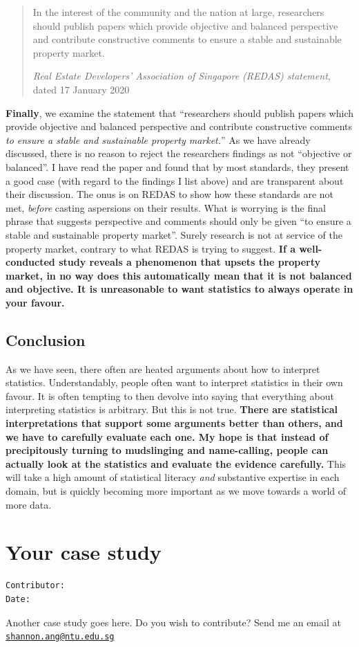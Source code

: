 \documentclass[openany]{book}
\begin{document}
\begin{quote}
In the interest of the community and the nation at large, researchers
should publish papers which provide objective and balanced perspective
and contribute constructive comments to ensure a stable and sustainable
property market.

\emph{Real Estate Developers' Association of Singapore (REDAS)
statement}, dated 17 January 2020
\end{quote}

\textbf{Finally}, we examine the statement that ``researchers should
publish papers which provide objective and balanced perspective and
contribute constructive comments \emph{to ensure a stable and
sustainable property market.}'' As we have already discussed, there is
no reason to reject the researchers findings as not ``objective or
balanced''. I have read the paper and found that by most standards, they
present a good case (with regard to the findings I list above) and are
transparent about their discussion. The onus is on REDAS to show how
these standards are not met, \emph{before} casting aspersions on their
results. What is worrying is the final phrase that suggests perspective
and comments should only be given ``to ensure a stable and sustainable
property market''. Surely research is not at service of the property
market, contrary to what REDAS is trying to suggest. \textbf{If a
well-conducted study reveals a phenomenon that upsets the property
market, in no way does this automatically mean that it is not balanced
and objective. It is unreasonable to want statistics to always operate
in your favour.}

\section{Conclusion}\label{conclusion-4}

As we have seen, there often are heated arguments about how to interpret
statistics. Understandably, people often want to interpret statistics in
their own favour. It is often tempting to then devolve into saying that
everything about interpreting statistics is arbitrary. But this is not
true. \textbf{There are statistical interpretations that support some
arguments better than others, and we have to carefully evaluate each
one. My hope is that instead of precipitously turning to mudslinging and
name-calling, people can actually look at the statistics and evaluate
the evidence carefully.} This will take a high amount of statistical
literacy \emph{and} substantive expertise in each domain, but is quickly
becoming more important as we move towards a world of more data.

\chapter{Your case study}\label{case3}

\begin{verbatim}
Contributor: 
Date: 
\end{verbatim}

Another case study goes here. Do you wish to contribute? Send me an
email at
\href{mailto:shannon.ang@ntu.edu.sg}{\nolinkurl{shannon.ang@ntu.edu.sg}}


\end{document}
